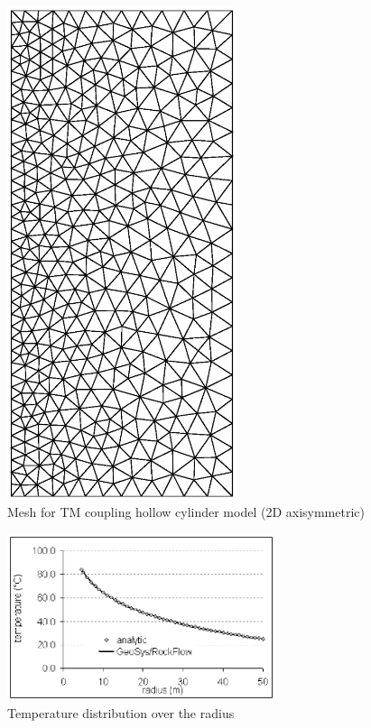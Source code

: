 \begin{figure}[htbp]
\centering
\includegraphics[width=0.6\textwidth]{PART_III/TM/figures/fig69.eps}
\caption{Mesh for TM coupling hollow cylinder model (2D axisymmetric)}
\label{fig69}
\end{figure}

\begin{figure}[htbp]
\centering
\includegraphics[width=0.7\textwidth]{PART_III/TM/figures/fig610}
\caption{Temperature distribution over the radius}
\label{fig610}
\end{figure}

